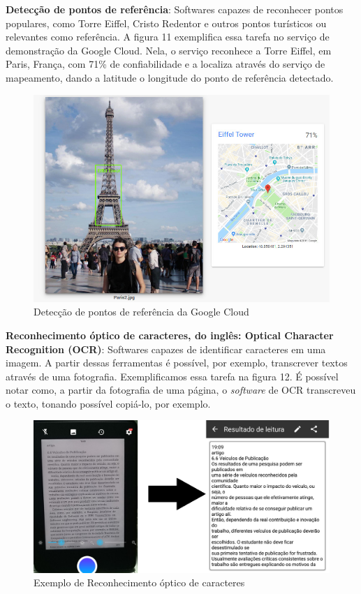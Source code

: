 \documentclass{article}
\begin{document}
\textbf{Detecção de pontos de referência}: Softwares capazes de reconhecer pontos populares, como Torre Eiffel, Cristo Redentor e outros pontos turísticos ou relevantes como referência. A figura 11 exemplifica essa tarefa no serviço de demonstração da Google Cloud. Nela, o serviço reconhece a Torre Eiffel, em Paris, França, com 71\% de confiabilidade e a localiza através do serviço de mapeamento, dando a latitude o longitude do ponto de referência detectado. \\
\begin{figure}[H]
    \centering
    \includegraphics[scale=0.3]{imagens/Paris2.jpg}
    \caption{Detecção de pontos de referência da Google Cloud}
    \label{fig:ponto_turistico}
\end{figure}{}
\textbf{Reconhecimento óptico de caracteres, do inglês: Optical Character Recognition (OCR)}: Softwares capazes de identificar caracteres em uma imagem. A partir dessas ferramentas é possível, por exemplo, transcrever textos através de uma fotografia. Exemplificamos essa tarefa na figura 12. É possível notar como, a partir da fotografia de uma página, o \textit{software} de OCR transcreveu o texto, tonando possível copiá-lo, por exemplo. \\
\begin{figure}[H]
    \centering
    \includegraphics[scale=0.15]{imagens/ocr.png}
    \caption{Exemplo de Reconhecimento óptico de caracteres}
    \label{fig:ocr}
\end{figure}{}
\end{document}
